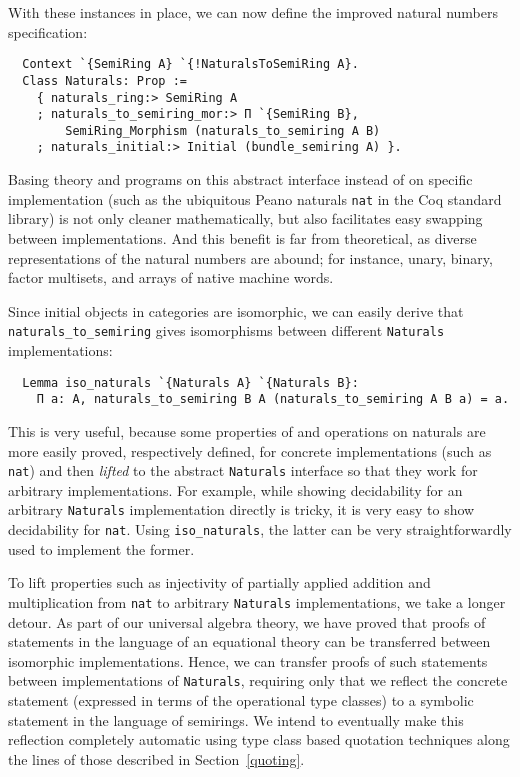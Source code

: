 \documentclass[a4paper,10pt,runningheads]{llncs}
\begin{document}
With these instances in place, we can now define the improved natural numbers specification:
\begin{lstlisting}
  Context `{SemiRing A} `{!NaturalsToSemiRing A}.
  Class Naturals: Prop :=
    { naturals_ring:> SemiRing A
    ; naturals_to_semiring_mor:> Π `{SemiRing B},
        SemiRing_Morphism (naturals_to_semiring A B)
    ; naturals_initial:> Initial (bundle_semiring A) }.
\end{lstlisting}
Basing theory and programs on this abstract interface instead of on specific implementation (such as the ubiquitous Peano naturals \lstinline|nat| in the Coq standard library) is not only cleaner mathematically, but also facilitates easy swapping between implementations. And this benefit is far from theoretical, as diverse representations of the natural numbers are abound; for instance, unary, binary, factor multisets, and arrays of native machine words.

Since initial objects in categories are isomorphic, we can easily derive that \lstinline|naturals_to_semiring| gives isomorphisms between different \lstinline|Naturals| implementations:
\begin{lstlisting}
  Lemma iso_naturals `{Naturals A} `{Naturals B}:
    Π a: A, naturals_to_semiring B A (naturals_to_semiring A B a) = a.
\end{lstlisting}
This is very useful, because some properties of and operations on naturals are more easily proved, respectively defined, for concrete implementations (such as \lstinline|nat|) and then \emph{lifted} to the abstract \lstinline|Naturals| interface so that they work for arbitrary implementations. For example, while showing decidability for an arbitrary \lstinline|Naturals| implementation directly is tricky, it is very easy to show decidability for \lstinline|nat|. Using \lstinline|iso_naturals|, the latter can be very straightforwardly used to implement the former.

To lift properties such as injectivity of partially applied addition and multiplication from \lstinline|nat| to arbitrary \lstinline|Naturals| implementations, we take a longer detour. As part of our universal algebra theory, we have proved that proofs of statements in the language of an equational theory can be transferred between isomorphic implementations. Hence, we can transfer proofs of such statements between implementations of \lstinline|Naturals|, requiring only that we reflect the concrete statement (expressed in terms of the operational type classes) to a symbolic statement in the language of semirings. We intend to eventually make this reflection completely automatic using type class based quotation techniques along the lines of those described in Section~\ref{quoting}.
\end{document}

